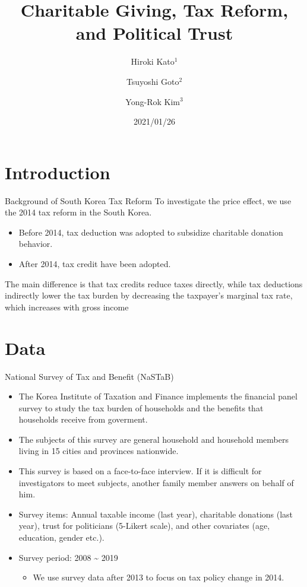 \documentclass[
  ignorenonframetext,
]{beamer}
\title{Charitable Giving, Tax Reform, and Political Trust}
\author{Hiroki Kato\(^1\) \and Tsuyoshi Goto\(^2\) \and Yong-Rok
Kim\(^3\)}
\date{2021/01/26}
\institute{\(^1\)Osaka University \and \(^2\)Chiba
University \and \(^3\)Kobe University}
\providecommand{\tightlist}{%
  \setlength{\itemsep}{0pt}\setlength{\parskip}{0pt}}
\begin{document}
\frame{\titlepage}

\hypertarget{introduction}{%
\section{Introduction}\label{introduction}}

\begin{frame}{Background of South Korea Tax Reform}
\protect\hypertarget{background-of-south-korea-tax-reform}{}
To investigate the price effect, we use the 2014 tax reform in the South
Korea.

\begin{itemize}
\tightlist
\item
  Before 2014, tax deduction was adopted to subsidize charitable
  donation behavior.
\item
  After 2014, tax credit have been adopted.
\end{itemize}

The main difference is that tax credits reduce taxes directly, while tax
deductions indirectly lower the tax burden by decreasing the taxpayer's
marginal tax rate, which increases with gross income
\end{frame}

\hypertarget{data}{%
\section{Data}\label{data}}

\begin{frame}{National Survey of Tax and Benefit (NaSTaB)}
\protect\hypertarget{national-survey-of-tax-and-benefit-nastab}{}
\begin{itemize}
\tightlist
\item
  The Korea Institute of Taxation and Finance implements the financial
  panel survey to study the tax burden of households and the benefits
  that households receive from goverment.
\item
  The subjects of this survey are general household and household
  members living in 15 cities and provinces nationwide.
\item
  This survey is based on a face-to-face interview. If it is difficult
  for investigators to meet subjects, another family member answers on
  behalf of him.
\item
  Survey items: Annual taxable income (last year), charitable donations
  (last year), trust for politicians (5-Likert scale), and other
  covariates (age, education, gender etc.).
\item
  Survey period: 2008 \textasciitilde{} 2019

  \begin{itemize}
  \tightlist
  \item
    We use survey data after 2013 to focus on tax policy change in 2014.
  \end{itemize}
\end{itemize}
\end{frame}
\end{document}
